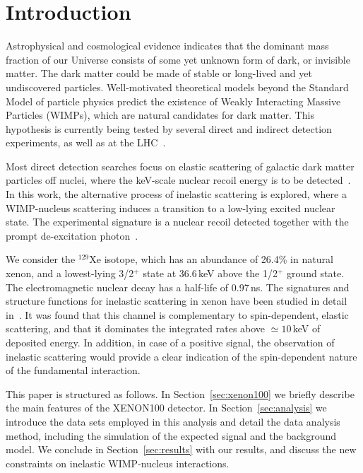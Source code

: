 \section{\label{sec:intro} Introduction}

Astrophysical and cosmological evidence indicates that the dominant mass fraction of our Universe consists of some yet unknown
form of dark, or invisible matter. The dark matter could be made of stable or long-lived and yet undiscovered particles. Well-motivated
theoretical models beyond the Standard Model of particle physics predict the existence of Weakly Interacting Massive
Particles (WIMPs), which are natural candidates for dark matter. This hypothesis is currently being tested by several direct
and indirect detection experiments, as well as at the LHC~\cite{Bertone:2010zza,Baudis:2016qwx}.

Most direct detection searches focus on elastic scattering of galactic dark matter particles off nuclei, where the keV-scale 
nuclear recoil energy is to be detected~\cite{Undagoitia:2015gya,Baudis:2015mpa}. In this work, the 
alternative process of inelastic scattering is explored, where a WIMP-nucleus scattering induces a transition to a low-lying 
excited nuclear state. The experimental signature is a nuclear recoil detected together with the prompt de-excitation 
photon~\cite{Ellis:1988nb}. 

We consider the $^{129}\text{Xe}$ isotope, which has an abundance of 26.4\% in natural xenon, and a lowest-lying 
3/2$^{+}$ state at 36.6\,keV above the 1/2$^+$ ground state. The electromagnetic nuclear decay has a half-life of 0.97\,ns. 
The signatures and structure functions for inelastic scattering in xenon have been studied in detail in~\cite{Baudis:2013bba}. It was found that this channel is complementary to spin-dependent, elastic scattering, and that it dominates the integrated rates above $\simeq10$\,keV of deposited energy. 
In addition, in case of a positive signal, the observation of inelastic scattering would provide a clear 
indication of the spin-dependent nature of the fundamental interaction. 

This paper is structured as follows.  In Section~\ref{sec:xenon100} we briefly describe the main features of the XENON100 detector.  In Section~\ref{sec:analysis} we introduce the data 
sets employed in this analysis and detail the data analysis method, including the simulation of the expected signal and the 
background model. We conclude in Section~\ref{sec:results} with our results, and discuss the new constraints on inelastic WIMP-nucleus interactions.

